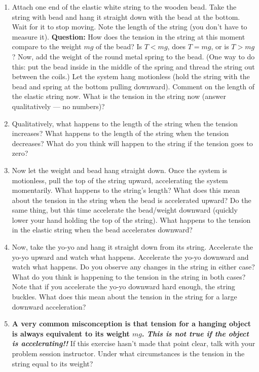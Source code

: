 \begin{exercise}
  \begin{enumerate}
  \item 
    Attach one end of the elastic white string to the wooden bead.
    Take the string with bead and hang it straight down with the bead at the bottom.  Wait for it to stop
    moving.  Note the length of the string (you don't have to measure
    it).  \textbf{Question:} How does the tension in the string at this
    moment compare to the weight $mg$ of the bead?  Is $T < mg$, does
    $T =mg$, or is $T> mg$?  Now, add the weight of the round metal
    spring to the bead.  (One way to do this: put the bead inside in the middle
    of the spring and thread the string out between the coils.)
    Let the system hang motionless (hold the string with the bead and spring
    at the bottom pulling downward).  Comment on the length of
    the elastic string now.  What is the tension in the string now
    (answer qualitatively --- no numbers)?

  \item Qualitatively, what happens to the length of the string when
    the tension increases?  What happens to the length of the string
    when the tension decreases?  What do you think will happen to the
    string if the tension goes to zero?

  \item Now let the weight and bead hang straight down.  Once the
    system is motionless, pull the top of the string upward,
    accelerating the system momentarily.  What happens to the string's
    length?  What does this mean about the tension in the string when
    the bead is accelerated upward?  Do the same thing, but this time
    accelerate the bead/weight downward (quickly lower your hand
    holding the top of the string).  What happens to the tension in
    the elastic string when the bead accelerates downward?

  \item Now, take the yo-yo and hang it straight down from its string.
    Accelerate the yo-yo upward and watch what happens.  Accelerate
    the yo-yo downward and watch what happens.  Do you observe any
    changes in the string in either case?  What do you think is
    happening to the tension in the string in both cases?  Note that
    if you accelerate the yo-yo downward hard enough, the string
    buckles.  What does this mean about the tension in the string for
    a large downward acceleration?

  \item \textbf{A very common misconception is that tension for a hanging
      object is always equivalent to its weight $mg$.  \emph{This is not
        true if the object is accelerating!!}}  If this exercise
    hasn't made that point clear, talk with your problem session
    instructor.  Under what circumstances is the tension in the string
    equal to its weight?

  \end{enumerate}
  \label{prob:return_ball}
\end{exercise}

